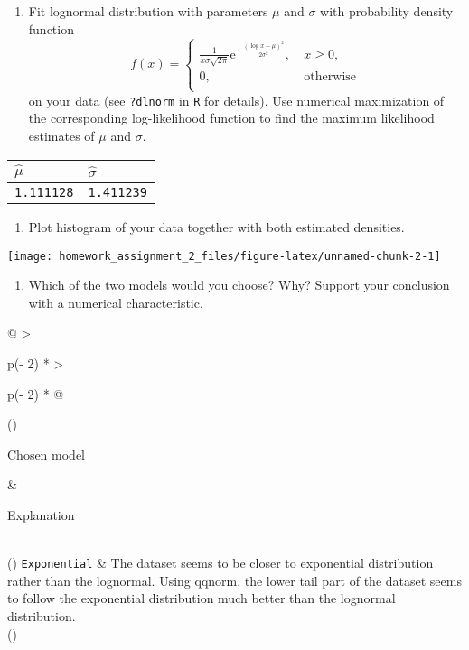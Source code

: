 \documentclass[
]{article}
\providecommand{\tightlist}{%
  \setlength{\itemsep}{0pt}\setlength{\parskip}{0pt}}
\begin{document}
\begin{enumerate}
\def\labelenumi{\alph{enumi})}
\setcounter{enumi}{1}
\tightlist
\item
  Fit lognormal distribution with parameters \(\mu\) and \(\sigma\) with
  probability density function
  \[ f(x)=\begin{cases} \frac{1}{x \sigma \sqrt{2 \pi}} \textrm{e}^{-\frac{(\log x - \mu)^2}{2\sigma^2
  }}, &\ x \geq 0, \\
  0, &\ \mbox{otherwise}
  \\ \end{cases}
  \] on your data (see \verb'?dlnorm' in \verb'R' for details). Use
  numerical maximization of the corresponding log-likelihood function to
  find the maximum likelihood estimates of \(\mu\) and \(\sigma\).
\end{enumerate}

\begin{longtable}[]{@{}ll@{}}
\toprule()
\(\widehat{\mu}\) & \(\widehat{\sigma}\) \\
\midrule()
\endhead
\texttt{1.111128} & \texttt{1.411239} \\
\bottomrule()
\end{longtable}

\begin{enumerate}
\def\labelenumi{\alph{enumi})}
\setcounter{enumi}{2}
\tightlist
\item
  Plot histogram of your data together with both estimated densities.
\end{enumerate}

\texttt{[image: homework\_assignment\_2\_files/figure-latex/unnamed-chunk-2-1]}

\begin{enumerate}
\def\labelenumi{\alph{enumi})}
\setcounter{enumi}{3}
\tightlist
\item
  Which of the two models would you choose? Why? Support your conclusion
  with a numerical characteristic.
\end{enumerate}

\begin{longtable}[]{@{}
  >{\raggedright\arraybackslash}p{(\columnwidth - 2\tabcolsep) * }
  >{\raggedright\arraybackslash}p{(\columnwidth - 2\tabcolsep) * }@{}}
\toprule()
\begin{minipage}[b]{\linewidth}\raggedright
Chosen model
\end{minipage} & \begin{minipage}[b]{\linewidth}\raggedright
Explanation
\end{minipage} \\
\midrule()
\endhead
\texttt{Exponential} & The dataset seems to be closer to exponential
distribution rather than the lognormal. Using qqnorm, the lower tail
part of the dataset seems to follow the exponential distribution much
better than the lognormal distribution. \\
\bottomrule()
\end{longtable}
\end{document}
